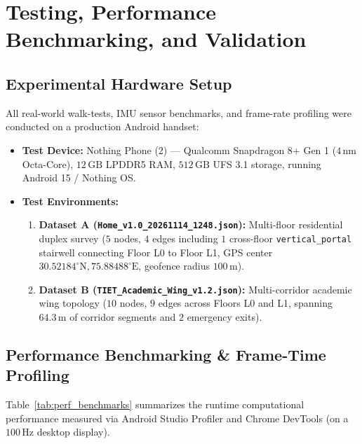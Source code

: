 \documentclass[11pt,a4paper]{article}
\begin{document}
\section{Testing, Performance Benchmarking, and Validation}

\subsection{Experimental Hardware Setup}
All real-world walk-tests, IMU sensor benchmarks, and frame-rate profiling were conducted on a production Android handset:
\begin{itemize}
    \item \textbf{Test Device:} Nothing Phone (2) — Qualcomm Snapdragon 8+ Gen 1 ($4\,\text{nm}$ Octa-Core), $12\,\text{GB}$ LPDDR5 RAM, $512\,\text{GB}$ UFS 3.1 storage, running Android 15 / Nothing OS.
    \item \textbf{Test Environments:}
    \begin{enumerate}
        \item \textbf{Dataset A (\texttt{Home\_v1.0\_20261114\_1248.json}):} Multi-floor residential duplex survey ($5$ nodes, $4$ edges including $1$ cross-floor \texttt{vertical\_portal} stairwell connecting Floor L0 to Floor L1, GPS center $30.52184^\circ\text{N}, 75.88488^\circ\text{E}$, geofence radius $100\,\text{m}$).
        \item \textbf{Dataset B (\texttt{TIET\_Academic\_Wing\_v1.2.json}):} Multi-corridor academic wing topology ($10$ nodes, $9$ edges across Floors L0 and L1, spanning $64.3\,\text{m}$ of corridor segments and $2$ emergency exits).
    \end{enumerate}
\end{itemize}

\subsection{Performance Benchmarking \& Frame-Time Profiling}
Table~\ref{tab:perf_benchmarks} summarizes the runtime computational performance measured via Android Studio Profiler and Chrome DevTools (on a $100\,\text{Hz}$ desktop display).
\end{document}
